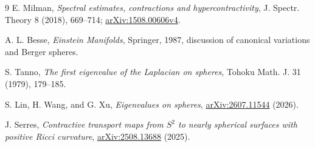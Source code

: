 \documentclass[10pt]{article}
\begin{document}
\begin{thebibliography}{9}
E. Milman, \emph{Spectral estimates, contractions and hypercontractivity},
J. Spectr. Theory 8 (2018), 669--714;
\href{https://arxiv.org/abs/1508.00606}{arXiv:1508.00606v4}.

A. L. Besse, \emph{Einstein Manifolds}, Springer, 1987, discussion of
canonical variations and Berger spheres.

S. Tanno, \emph{The first eigenvalue of the Laplacian on spheres},
Tohoku Math. J. 31 (1979), 179--185.

S. Lin, H. Wang, and G. Xu, \emph{Eigenvalues on spheres},
\href{https://arxiv.org/abs/2607.11544}{arXiv:2607.11544} (2026).

J. Serres, \emph{Contractive transport maps from $S^2$ to nearly spherical
surfaces with positive Ricci curvature},
\href{https://arxiv.org/abs/2508.13688}{arXiv:2508.13688} (2025).
\end{thebibliography}
\end{document}
